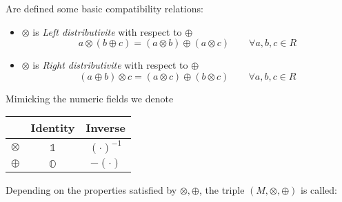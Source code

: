 \documentclass[a4paper,12pt]{scrartcl}
\newcommand{\OpA}{\otimes}
\newcommand{\OpB}{\oplus}
\begin{document}
Are defined some basic compatibility relations:
\begin{itemize}
\item $\OpA$ is \emph{Left distributivite} with respect to $\OpB$
	\begin{equation}\label{LeftDistributivity}
		a \OpA ( b \OpB c) = (a \OpA b) \OpB (a \OpA c) \qquad \forall a,b,c \in R
	\end{equation}
\item  $\OpA$ is \emph{Right distributivite} with respect to $\OpB$
	\begin{equation}\label{RightDistributivity}
		( a \OpB b)\OpA c = (a \OpA c) \OpB (b \OpA c) \qquad \forall a,b,c \in R	
	\end{equation}
\end{itemize}
\begin{notationfix}
	Mimicking the numeric fields we denote
	\begin{tabular}{|c|c c|}
		\hline 
			& Identity & Inverse \\
		\hline
		$\OpA$ & $\mathbb{1}$ & $(\cdot)^{-1}$\\
		$\OpB$ & $\mathbb{O}$ & $-(\cdot)$\\
		\hline
	\end{tabular}

\end{notationfix}

Depending on the properties satisfied by $\OpA,\OpB$, the triple $(M,\OpA,\OpB)$ is called:
\end{document}
